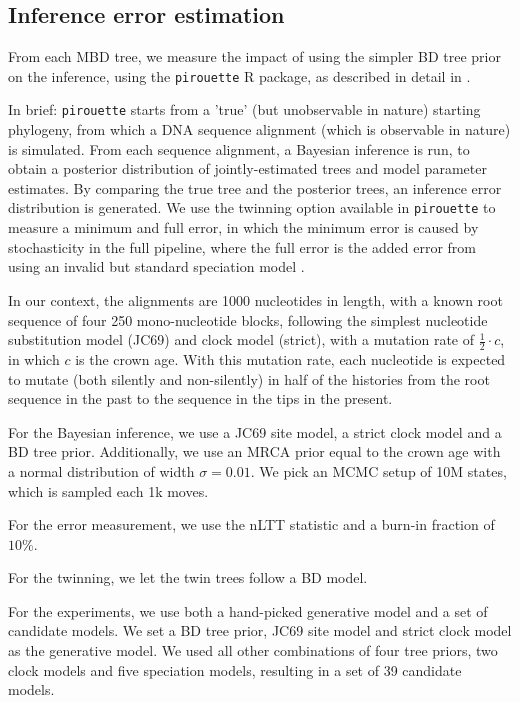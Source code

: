 

\subsection{Inference error estimation}

From each MBD tree, we measure the impact of using the simpler BD tree prior on the inference, using the \verb;pirouette; R package, as described in detail in \citep{pirouette}.

In brief: \verb;pirouette; starts from a 'true' (but unobservable in nature) starting phylogeny, from which a DNA sequence alignment (which is observable in nature) is simulated. 
From each sequence alignment, a Bayesian inference is run, to obtain a posterior distribution of jointly-estimated trees and model parameter estimates.
By comparing the true tree and the posterior trees, an inference error distribution is generated. 
We use the twinning option available in \verb;pirouette; to measure a minimum and full error, in which the minimum error is caused by stochasticity in the full pipeline, where the full error is the added error from using an invalid but standard speciation model .

In our context, the alignments are 1000 nucleotides in length, with a known root sequence of four 250 mono-nucleotide blocks, following the simplest nucleotide substitution model (JC69) and clock model (strict), with a mutation rate of $\frac{1}{2}\cdot c$,  in which $c$ is the crown age. With this mutation rate, each nucleotide is expected to mutate (both silently and non-silently) 
in half of the histories from the root sequence in the past to the sequence in the tips in the present.

For the Bayesian inference, we use a JC69 site model, a strict
clock model and a BD tree prior. Additionally, we use 
an MRCA prior equal to the crown age with a normal distribution 
of width $\sigma = 0.01$. We pick an MCMC setup of 10M states,
which is sampled each 1k moves.

For the error measurement, we use the nLTT statistic \citet{janzen2015} and
a burn-in fraction of $10\%$.

For the twinning, we let the twin trees follow a BD model.

For the experiments, we use both a hand-picked generative model
and a set of candidate models. We set a BD tree prior, JC69 site
model and strict clock model as the generative model. We used
all other combinations of four tree priors, two clock models and
five speciation models, resulting in a set of 39 candidate models.
